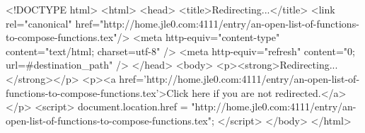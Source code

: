 <!DOCTYPE html>
<html>
<head>
<title>Redirecting...</title>
<link rel="canonical" href="http://home.jle0.com:4111/entry/an-open-list-of-functions-to-compose-functions.tex"/>
<meta http-equiv="content-type" content="text/html; charset=utf-8" />
<meta http-equiv="refresh" content="0; url=#{destination_path}" />
</head>
<body>
  <p><strong>Redirecting...</strong></p>
  <p><a href='http://home.jle0.com:4111/entry/an-open-list-of-functions-to-compose-functions.tex'>Click here if you are not redirected.</a></p>
  <script>
    document.location.href = "http://home.jle0.com:4111/entry/an-open-list-of-functions-to-compose-functions.tex";
  </script>
</body>
</html>
